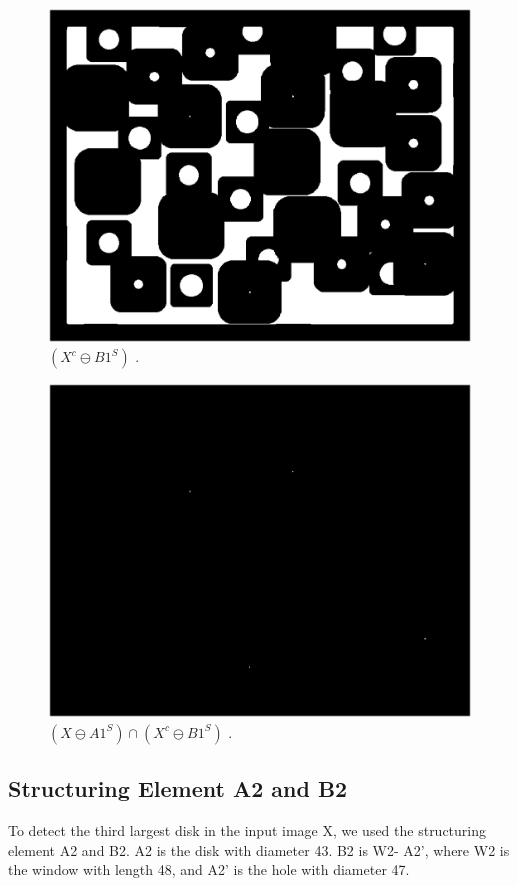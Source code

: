 \documentclass[paper=a4, fontsize=11pt]{scrartcl}
\begin{document}
\begin{figure}
	\centering
	\includegraphics[width=12cm]{SecondBiggestDisk_Xc_sub_Bs.eps}
	\caption{ $( X^c \ominus B1^S)$ .}
	\label{fig:7}
\end{figure}

\begin{figure}
	\centering
	\includegraphics[width=12cm]{SecondBiggestDisk_central_points.eps}
	\caption{ $( X \ominus A1^S) \cap ( X^c \ominus B1^S)$ .}
	\label{fig:8}
\end{figure}


\subsection{Structuring Element A2 and B2}


To detect the third largest disk in the input image X, we used the structuring element A2 and B2. A2 is the disk with diameter 43. B2 is W2- A2', where W2 is the window with length 48, and A2' is the hole with diameter 47.
\end{document}

